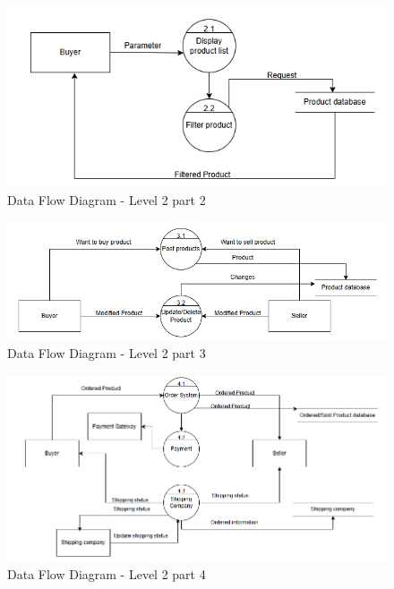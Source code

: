 \begin{figure}[!h]
	\centering
	\includegraphics[width=1\textwidth]{chapters/ch-03/DFDL2_2.png} %
	\caption{Data Flow Diagram - Level 2 part 2}
	\label{fig:DFD2_2} %
\end{figure}

\begin{figure}[!h]
	\centering
	\includegraphics[width=1\textwidth]{chapters/ch-03/DFDL2_3.png} %
	\caption{Data Flow Diagram - Level 2 part 3}
	\label{fig:DFD2_3} %
\end{figure}

\begin{figure}[!h]
	\centering
	\includegraphics[width=1\textwidth]{chapters/ch-03/DFDL2_4.png} %
	\caption{Data Flow Diagram - Level 2 part 4}
	\label{fig:DFD2_4} %
\end{figure}

